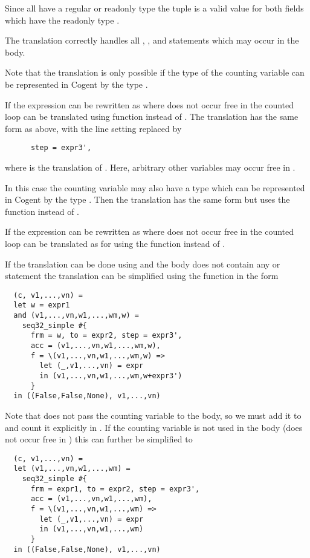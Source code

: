 Since all  have a regular or readonly type the tuple  is a valid value for 
both  fields which have the readonly type .

The translation correctly handles all , , and  statements which may occur 
in the body. 

Note that the translation is only possible if the type of the counting variable  can be represented in 
Cogent by the type .

If the expression  can be rewritten as  where  does not occur free in 
the counted loop can be translated using 
function  instead of . The translation has the same form as above, with the line 
setting  replaced by
\begin{verbatim}
      step = expr3', 
\end{verbatim}
where  is the translation of . Here, arbitrary other variables may occur free in .

In this case the counting variable  may also have a type which can be represented in Cogent by the type .
Then the translation has the same form but uses the function  instead of .

If the expression  can be rewritten as  where  does not occur free in 
the counted loop can be translated as for  using the function  instead of .

If the translation can be done using  and the body does not contain any  or  statement 
the translation can be simplified using the function  in the form
\begin{verbatim}
  (c, v1,...,vn) = 
  let w = expr1
  and (v1,...,vn,w1,...,wm,w) = 
    seq32_simple #{
      frm = w, to = expr2, step = expr3', 
      acc = (v1,...,vn,w1,...,wm,w), 
      f = \(v1,...,vn,w1,...,wm,w) => 
        let (_,v1,...,vn) = expr
        in (v1,...,vn,w1,...,wm,w+expr3')
      }
  in ((False,False,None), v1,...,vn)
\end{verbatim}
Note that  does not pass the counting variable  to the body, so we must add it to 
and count it explicitly in .
If the counting variable  is not used in the body (does not occur free in ) this can further be simplified to
\begin{verbatim}
  (c, v1,...,vn) = 
  let (v1,...,vn,w1,...,wm) = 
    seq32_simple #{
      frm = expr1, to = expr2, step = expr3', 
      acc = (v1,...,vn,w1,...,wm), 
      f = \(v1,...,vn,w1,...,wm) => 
        let (_,v1,...,vn) = expr
        in (v1,...,vn,w1,...,wm)
      }
  in ((False,False,None), v1,...,vn)
\end{verbatim}

